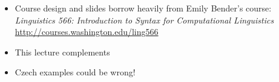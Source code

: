 \documentclass[a4paper,landscape,headrule,footrule]{foils}
\begin{document}
\overview
{}



%



\begin{itemize}
\item Course design and slides borrow heavily from Emily Bender's course:
\textit{Linguistics 566: Introduction to Syntax for Computational Linguistics}
\\ \url{http://courses.washington.edu/ling566}
\item This lecture complements \citet[Chapter 12]{sag:wasow:bender:2003}
\item Czech examples could be wrong!
\end{itemize}
\small


\end{document}
